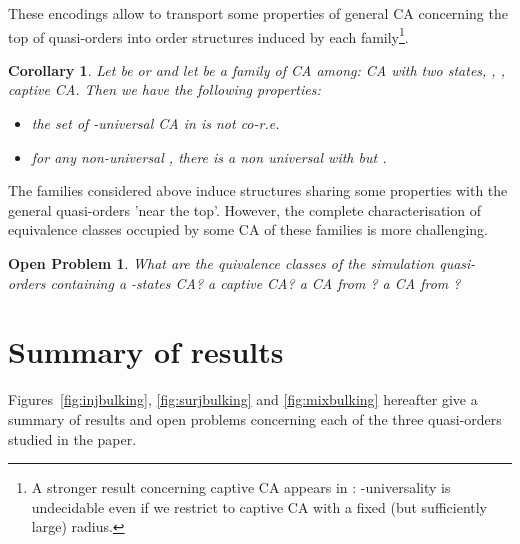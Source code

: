 \documentclass[a4paper]{elsarticle}
\def\qed{\relax\ifmmode\hskip2em \blacksquare\else\unskip\nobreak\hfill\hskip1em \fi}
\newtheorem{openpb}{Open Problem}
\newtheorem{cor}{Corollary}[section]
\begin{document}
These encodings allow to transport some properties of general CA
concerning the top of quasi-orders into order structures induced by
each family\footnote{A stronger result concerning captive CA appears
  in \cite{Theyssier05}: -universality is undecidable even if
  we restrict to captive CA with a fixed (but sufficiently large)
  radius.}.

\begin{cor}
  Let  be  or  and let  be a
  family of CA among: CA with two states, , , captive
  CA.  Then we have the following properties:
  \begin{itemize}
  \item the set of -universal CA in  is not co-r.e.
  \item for any non-universal , there is a non universal
     with  but .
  \end{itemize}
\end{cor}

The families considered above induce structures sharing some
properties with the general quasi-orders 'near the top'. However, the
complete characterisation of equivalence classes occupied by some CA
of these families is more challenging.

\begin{openpb}
  What are the quivalence classes of the simulation quasi-orders
  containing a -states CA? a captive CA? a CA from ? a CA
  from ?
\end{openpb}

\section{Summary of results}

Figures~\ref{fig:injbulking}, \ref{fig:surjbulking} and \ref{fig:mixbulking}
hereafter give a summary of results and open problems concerning each of the three
quasi-orders studied in the paper.
\end{document}
